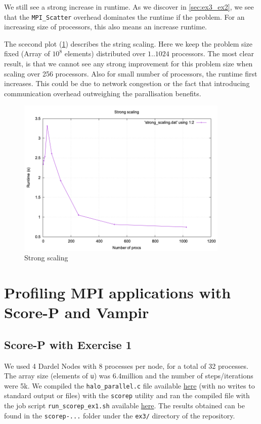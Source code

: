 \documentclass[a4paper,10pt]{article}
\begin{document}
We still see a strong increase in runtime.
As we discover in \ref{sec:ex3_ex2}, we see that the \verb|MPI_Scatter| overhead dominates the runtime if the problem.
For an increasing size of processors, this also means an increase runtime.

The scecond plot (\ref{fig:ex2_strong_scaling}) describes the string scaling. Here we keep the problem size fixed (Array of $10^8$ elements) distributed over $1..1024$ processors.
The most clear result, is that we cannot see any strong improvement for this problem size when scaling over 256 processors.
Also for small number of processors, the runtime first increases. This could be due to network congestion or the fact that introducing communication overhead outweighing the parallisation benefits.

\begin{figure}[H]
  \centering
  \includegraphics[width=0.9\textwidth]{img/ex2_strong_scaling}
  \caption{Strong scaling}
  \label{fig:ex2_strong_scaling}
\end{figure}

\section{Profiling MPI applications with Score-P and Vampir}

\subsection{Score-P with Exercise 1}
We used 4 Dardel Nodes with 8 processes per node, for a total of 32 processes. The array size (elements of \verb|u|) was 6.4million and the number of steps/iterations were 5k. We compiled the \verb|halo_parallel.c| file available \href{https://github.com/paulmyr/DD2356-MethodsHPC/blob/master/4_mpi/ex3/halo_parallel.c}{here} (with no writes to standard output or files) with the \verb|scorep| utility and ran the compiled file with the job script \verb|run_scorep_ex1.sh| available \href{https://github.com/paulmyr/DD2356-MethodsHPC/blob/master/4_mpi/ex3/run_scorep_ex1.sh}{here}. The results obtained can be found in the \verb|scorep-...| folder under the \verb|ex3/| directory of the repository. 
\end{document}
